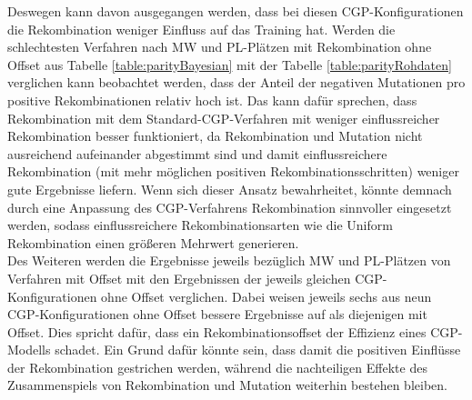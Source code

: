 Deswegen kann davon ausgegangen werden, dass bei diesen CGP-Konfigurationen die Rekombination weniger Einfluss auf das Training hat.
Werden die schlechtesten Verfahren nach MW und PL-Plätzen mit Rekombination ohne Offset aus Tabelle \ref{table:parityBayesian} mit der Tabelle \ref{table:parityRohdaten} verglichen kann beobachtet werden, dass der Anteil der negativen Mutationen pro positive Rekombinationen relativ hoch ist.
Das kann dafür sprechen, dass Rekombination mit dem Standard-CGP-Verfahren mit weniger einflussreicher Rekombination besser funktioniert, da Rekombination und Mutation nicht ausreichend aufeinander abgestimmt sind und damit einflussreichere Rekombination (mit mehr möglichen positiven Rekombinationsschritten) weniger gute Ergebnisse liefern.
Wenn sich dieser Ansatz bewahrheitet, könnte demnach durch eine Anpassung des CGP-Verfahrens Rekombination sinnvoller eingesetzt werden, sodass einflussreichere Rekombinationsarten wie die Uniform Rekombination einen größeren Mehrwert generieren.\\
Des Weiteren werden die Ergebnisse jeweils bezüglich MW und PL-Plätzen von Verfahren mit Offset mit den Ergebnissen der jeweils gleichen CGP-Konfigurationen ohne Offset verglichen.
Dabei weisen jeweils sechs aus neun CGP-Konfigurationen ohne Offset bessere Ergebnisse auf als diejenigen mit Offset.
Dies spricht dafür, dass ein Rekombinationsoffset der Effizienz eines CGP-Modells schadet.
Ein Grund dafür könnte sein, dass damit die positiven Einflüsse der Rekombination gestrichen werden, während die nachteiligen Effekte des Zusammenspiels von Rekombination und Mutation weiterhin bestehen bleiben.
